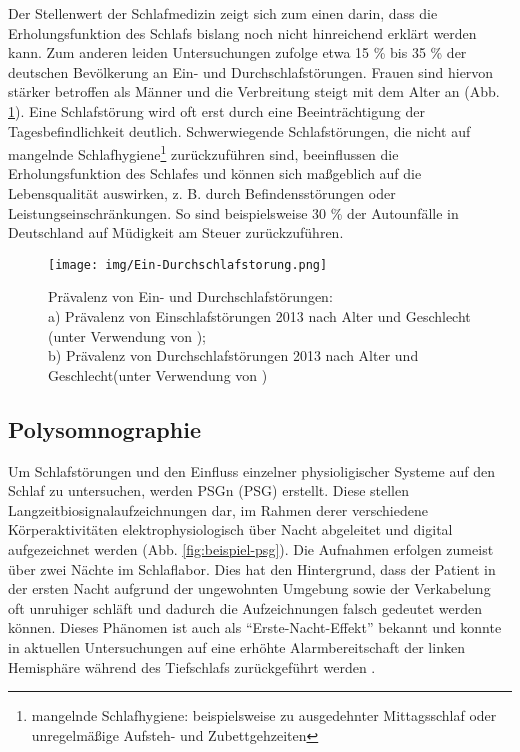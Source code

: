 Der Stellenwert der Schlafmedizin zeigt sich zum einen darin, dass die Erholungsfunktion des Schlafs bislang noch nicht hinreichend erklärt werden kann. Zum anderen leiden Untersuchungen zufolge etwa 15 \% bis 35 \% der deutschen Bevölkerung an Ein- und Durchschlafstörungen. Frauen sind hiervon stärker betroffen als Männer und die Verbreitung steigt mit dem Alter an (Abb. \ref{fig:ein-durchschlafstörung}). Eine Schlafstörung wird oft erst durch eine Beeinträchtigung der Tagesbefindlichkeit deutlich. Schwerwiegende Schlafstörungen, die nicht auf mangelnde Schlafhygiene\footnote{mangelnde Schlafhygiene: beispielsweise zu ausgedehnter Mittagsschlaf oder unregelmäßige Aufsteh- und Zubettgehzeiten} zurückzuführen sind, beeinflussen die Erholungsfunktion des Schlafes und können sich maßgeblich auf die Lebensqualität auswirken, z. B. durch Befindensstörungen oder Leistungseinschränkungen. So sind beispielsweise 30 \% der Autounfälle in Deutschland auf Müdigkeit am Steuer zurückzuführen. \parencite{mayer_s3-leitlinie_2009, happe_schlafmedizin_2009, penzel_schlafstorungen_2005}

\begin{figure}[H]
	\centering
	\texttt{[image: img/Ein-Durchschlafstorung.png]}
	\caption[Prävalenz von Ein- und Durchschlafstörungen]{Prävalenz von Ein- und Durchschlafstörungen:\\a) Prävalenz von Einschlafstörungen 2013 nach Alter und Geschlecht (unter Verwendung von \parencite{schlack_haufigkeit_2013});\\b) Prävalenz von Durchschlafstörungen 2013 nach Alter und Geschlecht(unter Verwendung von  \parencite{schlack_haufigkeit_2013})}
	\label{fig:ein-durchschlafstörung}
\end{figure}

\subsection{Polysomnographie}\label{psg} 

Um Schlafstörungen und den Einfluss einzelner physioligischer Systeme auf den Schlaf zu untersuchen, werden \acl{PSG}n (\acs{PSG}) erstellt. Diese stellen Langzeitbiosignalaufzeichnungen dar, im Rahmen derer verschiedene Körperaktivitäten elektrophysiologisch über Nacht abgeleitet und digital aufgezeichnet werden (Abb. \ref{fig:beispiel-psg}). Die Aufnahmen erfolgen zumeist über zwei Nächte im Schlaflabor. Dies hat den Hintergrund, dass der Patient in der ersten Nacht aufgrund der ungewohnten Umgebung sowie der Verkabelung oft unruhiger schläft und dadurch die Aufzeichnungen falsch gedeutet werden können. Dieses Phänomen ist auch als "`Erste-Nacht-Effekt"' bekannt und konnte in aktuellen Untersuchungen auf eine erhöhte Alarmbereitschaft der linken Hemisphäre während des Tiefschlafs zurückgeführt werden \parencite{tamaki_night_2016}. \\

